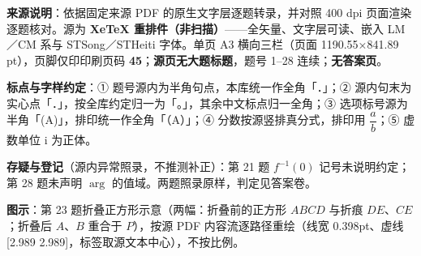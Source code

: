 


\begin{gktip}
\textbf{来源说明}：依据固定来源 PDF 的原生文字层逐题转录，并对照 400 dpi 页面渲染逐题核对。源为 \textbf{XeTeX 重排件（非扫描）}——全矢量、文字层可读、嵌入 LM／CM 系与 STSong／STHeiti 字体。单页 A3 横向三栏（页面 1190.55×841.89 pt），页脚仅印印刷页码 \textbf{45}；\textbf{源页无大题标题}，题号 1–28 连续；\textbf{无答案页}。

\textbf{标点与字样约定}：① 题号源内为半角句点，本库统一作全角「．」；② 源内句末为实心点「．」，按全库约定归一为「。」，其余中文标点归一全角；③ 选项标号源为半角「(A)」，排印统一作全角「（A）」；④ 分数按源竖排真分式，排印用 \(\dfrac{a}{b}\)；⑤ 虚数单位 \(\mathrm{i}\) 为正体。

\textbf{存疑与登记}（源内异常照录，不推测补正）：第 21 题 \(f^{-1}(0)\) 记号未说明约定；第 28 题未声明 \(\arg\) 的值域。两题照录原样，判定见答案卷。

\textbf{图示}：第 23 题折叠正方形示意（两幅：折叠前的正方形 \(ABCD\) 与折痕 \(DE\)、\(CE\)；折叠后 \(A\)、\(B\) 重合于 \(P\)），按源 PDF 内容流逐路径重绘（线宽 0.398pt、虚线 [2.989 2.989]，标签取源文本中心），不按比例。
\end{gktip}

